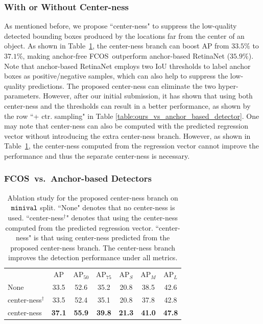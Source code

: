 \documentclass[10pt,twocolumn,letterpaper]{article}
\renewcommand{\texttt}[1]{ $ {{\tt #1} } $}
\newcommand{\1}{{\mathbbm{1}}}           %
\def\Ours{{FCNDet}\xspace}
\def\Ours{{FCOS}\xspace}
\begin{document}
\subsubsection{With or Without Center-ness}
As mentioned before, we propose ``center-ness" to suppress the low-quality detected bounding boxes produced by the locations far from the center of an object. As shown in Table~\ref{table:center-ness}, the center-ness branch can boost AP from $33.5\%$ to $37.1\%$, making anchor-free \Ours\ outperform anchor-based RetinaNet ($35.9\%$). Note that anchor-based RetinaNet employs two IoU thresholds to label anchor boxes as positive/negative samples, which can also help to suppress the low-quality predictions. The proposed center-ness can eliminate the two hyper-parameters. However, after our initial submission, it has shown that using both center-ness and the thresholds can result in a better performance, as shown by the row ``+ ctr. sampling" in Table \ref{table:ours_vs_anchor_based_detector}. One may note that center-ness can also be computed with the predicted regression vector without introducing the extra center-ness branch. However, as shown in Table~\ref{table:center-ness}, the center-ness computed from the regression vector cannot improve the performance and thus the separate center-ness is necessary.


\subsubsection{\Ours\ vs.\ Anchor-based Detectors}
%
%
%
%
%
%
%
%
%
%
%
%
%
%
%
%
%
%

\begin{table}
%
\centering 
\small
\begin{tabular}{ l|c|c c|c c c }
 & AP & AP$_{50}$ & AP$_{75}$ & AP$_{S}$ & AP$_{M}$ & AP$_{L}$ \\
\Xhline{2\arrayrulewidth}
None & 33.5 & 52.6 & 35.2 & 20.8 & 38.5 & 42.6 \\
center-ness$^\dag$ & 33.5 & 52.4 & 35.1 & 20.8 & 37.8 & 42.8 \\
center-ness & \textbf{37.1} & \textbf{55.9} & \textbf{39.8} & \textbf{21.3} & \textbf{41.0} & \textbf{47.8} \\
\end{tabular}
%
\caption{Ablation study for the proposed center-ness branch on \texttt{minival} split. ``None" denotes that  no center-ness is used.  ``center-ness$^\dag$" denotes that using the center-ness computed from the predicted regression vector. ``center-ness" is that using center-ness predicted from the proposed center-ness branch. The center-ness branch improves the detection performance under all metrics.}
\label{table:center-ness}
\vspace{-0.7cm}
\end{table}
\end{document}
